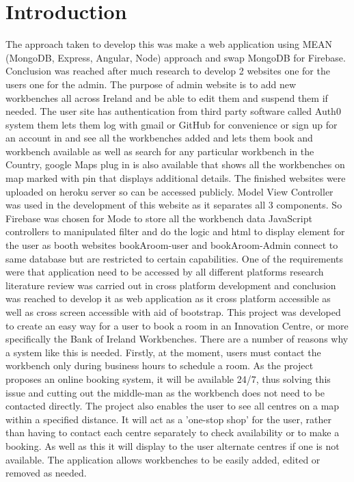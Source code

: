 \chapter{Introduction}
\bigbreak

The approach taken to develop this was make a web application using MEAN (MongoDB, Express, Angular, Node) approach and swap MongoDB for Firebase. Conclusion was reached after much research to develop 2 websites one for the users one for the admin. The purpose of admin website is to add new workbenches all across Ireland and be able to edit them and suspend them if needed. The user site has authentication from third party software called Auth0 system them lets them log with gmail or GitHub for convenience or sign up for an account in and see all the workbenches added and lets them book and workbench available as well as search for any particular workbench in the Country, google Maps plug in is also available that shows all the workbenches on map marked with pin that displays additional details. The finished websites were uploaded on heroku server so can be accessed publicly.
Model View Controller was used in the development of this website as it separates all 3 components. So Firebase was chosen for Mode to store all the workbench data JavaScript controllers to manipulated  filter and do the logic and html to display element for the user as booth  websites bookAroom-user and bookAroom-Admin connect to same database but are restricted to certain capabilities. One of the requirements were that application need to be accessed by all different platforms research literature review was carried out in cross platform development and conclusion was reached to develop it as web application as it cross platform accessible as well as cross screen accessible with aid of bootstrap.
This project was developed to create an easy way for a user to book a room in an Innovation Centre, or more specifically the Bank of Ireland Workbenches. There are a number of reasons why a system like this is needed.
Firstly, at the moment, users must contact the workbench only during business hours to schedule a room. As the project proposes an online booking system, it will be available 24/7, thus solving this issue and cutting out the middle-man as the workbench does not need to be contacted directly.
The project also enables the user to see all centres on a map within a specified distance. It will act as a 'one-stop shop' for the user, rather than having to contact each centre separately to check availability or to make a booking. As well as this it will display to the user alternate centres if one is not available. The application allows workbenches to be easily added, edited or removed as needed.



